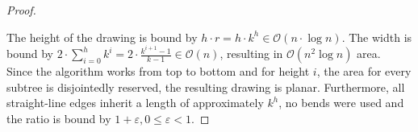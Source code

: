 \begin{proof}
\begin{algorithm}[H]
{			
		}		
	\end{algorithm}
	The height of the drawing is bound by $h\cdot r = h\cdot k^h \in \mathcal{O}(n\cdot \log n)$. 
	The width is bound by $2\cdot\sum_{i = 0}^{h} k^i = 2\cdot \frac{k^{i+1}-1}{k-1} \in \mathcal{O}(n)$, resulting in $\mathcal{O}(n^2\log n)$ area.\\ 
	Since the algorithm works from top to bottom and for height $i$, the area for every subtree is disjointedly reserved, the resulting drawing is planar. Furthermore, all straight-line edges inherit a length of approximately $k^h$, no bends were used and the ratio is bound by $1+\varepsilon, 0\leq \varepsilon<1$.
	
\end{proof}

